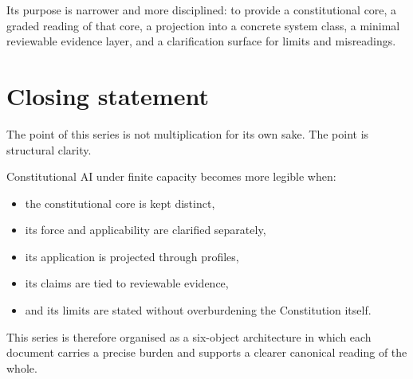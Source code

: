 \documentclass[11pt]{article}
\begin{document}
Its purpose is narrower and more disciplined: to provide a constitutional core, a graded reading of that core, a projection into a concrete system class, a minimal reviewable evidence layer, and a clarification surface for limits and misreadings.

\section{Closing statement}

The point of this series is not multiplication for its own sake. The point is structural clarity.

Constitutional AI under finite capacity becomes more legible when:
\begin{itemize}[leftmargin=2em]
    \item the constitutional core is kept distinct,
    \item its force and applicability are clarified separately,
    \item its application is projected through profiles,
    \item its claims are tied to reviewable evidence,
    \item and its limits are stated without overburdening the Constitution itself.
\end{itemize}

This series is therefore organised as a six-object architecture in which each document carries a precise burden and supports a clearer canonical reading of the whole.
\end{document}
